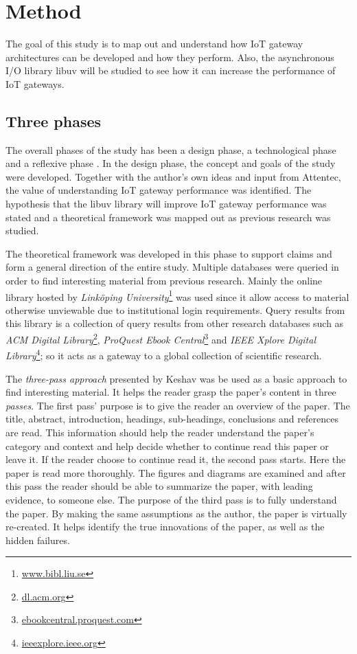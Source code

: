 \chapter{Method}
\label{cha:method}

The goal of this study is to map out and understand how IoT gateway
architectures can be developed and how they perform. Also, the asynchronous I/O
library libuv will be studied to see how it can increase the performance of IoT
gateways.

\section{Three phases}

The overall phases of the study has been a design phase, a technological phase
and a reflexive phase \cite{novikov2013research}. In the design phase, the
concept and goals of the study were developed. Together with the author's own
ideas and input from Attentec, the value of understanding IoT gateway
performance was identified. The hypothesis that the libuv library will improve
IoT gateway performance was stated and a theoretical framework was mapped out
as previous research was studied.

The theoretical framework was developed in this phase to support claims and
form a general direction of the entire study. Multiple databases were queried
in order to find interesting material from previous research. Mainly the online
library hosted by \textit{Linköping University}\footnote{\url{www.bibl.liu.se}}
was used since it allow access to material otherwise unviewable due to
institutional login requirements. Query results from this library is a
collection of query results from other research databases such as \textit{ACM
Digital Library}\footnote{\url{dl.acm.org}}, \textit{ProQuest Ebook
Central}\footnote{\url{ebookcentral.proquest.com}} and \textit{IEEE Xplore
Digital Library}\footnote{\url{ieeexplore.ieee.org}}; so it acts as a gateway
to a global collection of scientific research.

The \textit{three-pass approach} presented by Keshav \cite{keshav2007read} was
be used as a basic approach to find interesting material. It helps the reader
grasp the paper's content in three \textit{passes}. The first pass' purpose is
to give the reader an overview of the paper. The title, abstract, introduction,
headings, sub-headings, conclusions and references are read. This information
should help the reader understand the paper's category and context and help
decide whether to continue read this paper or leave it. If the reader choose to
continue read it, the second pass starts. Here the paper is read more
thoroughly. The figures and diagrams are examined and after this pass the
reader should be able to summarize the paper, with leading evidence, to someone
else. The purpose of the third pass is to fully understand the paper. By making
the same assumptions as the author, the paper is virtually re-created. It helps
identify the true innovations of the paper, as well as the hidden failures.

